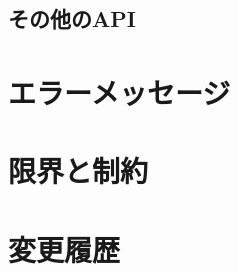\documentclass[12pt,a4paper,dvipdfmx]{jbook} %
\begin{document}
\section{その他のAPI}
\label{sec:other_APIs}

\newpage

\chapter{エラーメッセージ}
\label{chap:error_messages}

\newpage

\chapter{限界と制約}
\label{chap:limitation}

\newpage

\chapter{変更履歴}
\label{chap:change_log}


\printindex
\end{document}
